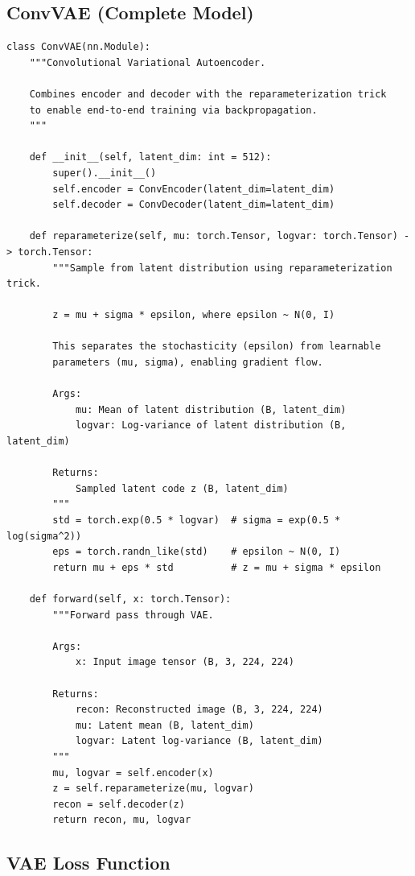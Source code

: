 \documentclass[11pt,a4paper]{article}
\begin{document}
\subsection{ConvVAE (Complete Model)}

\begin{lstlisting}[caption={src/conv\_vae.py - ConvVAE Model}, label={lst:convvae}]
class ConvVAE(nn.Module):
    """Convolutional Variational Autoencoder.

    Combines encoder and decoder with the reparameterization trick
    to enable end-to-end training via backpropagation.
    """

    def __init__(self, latent_dim: int = 512):
        super().__init__()
        self.encoder = ConvEncoder(latent_dim=latent_dim)
        self.decoder = ConvDecoder(latent_dim=latent_dim)

    def reparameterize(self, mu: torch.Tensor, logvar: torch.Tensor) -> torch.Tensor:
        """Sample from latent distribution using reparameterization trick.

        z = mu + sigma * epsilon, where epsilon ~ N(0, I)

        This separates the stochasticity (epsilon) from learnable
        parameters (mu, sigma), enabling gradient flow.

        Args:
            mu: Mean of latent distribution (B, latent_dim)
            logvar: Log-variance of latent distribution (B, latent_dim)

        Returns:
            Sampled latent code z (B, latent_dim)
        """
        std = torch.exp(0.5 * logvar)  # sigma = exp(0.5 * log(sigma^2))
        eps = torch.randn_like(std)    # epsilon ~ N(0, I)
        return mu + eps * std          # z = mu + sigma * epsilon

    def forward(self, x: torch.Tensor):
        """Forward pass through VAE.

        Args:
            x: Input image tensor (B, 3, 224, 224)

        Returns:
            recon: Reconstructed image (B, 3, 224, 224)
            mu: Latent mean (B, latent_dim)
            logvar: Latent log-variance (B, latent_dim)
        """
        mu, logvar = self.encoder(x)
        z = self.reparameterize(mu, logvar)
        recon = self.decoder(z)
        return recon, mu, logvar
\end{lstlisting}

\subsection{VAE Loss Function}
\end{document}
